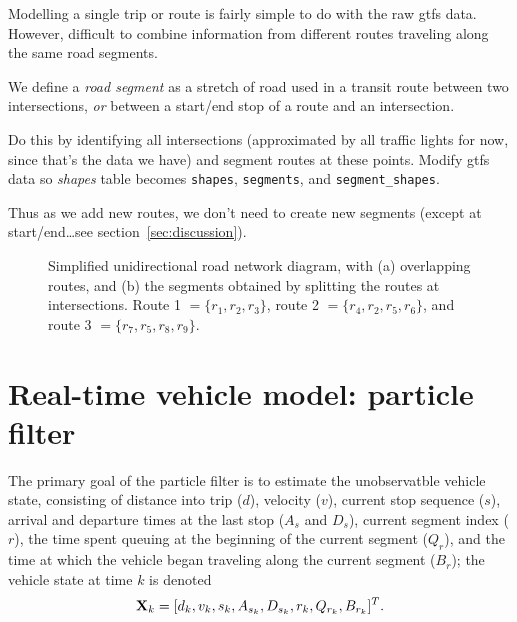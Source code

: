 \documentclass[draftcls,a4paper,onecolumn]{IEEEtran}\usepackage[]{graphicx}\usepackage[]{color}
\newenvironment{knitrout}{}{} %
\begin{document}
Modelling a single trip or route is fairly simple to do with the raw \gls{gtfs} data.
However, difficult to combine information from different routes traveling along the same road segments.

We define a \emph{road segment} as a stretch of road used in a transit route between two intersections,
\emph{or} between a start/end stop of a route and an intersection.

Do this by identifying all intersections
(approximated by all traffic lights for now, since that's the data we have)
and segment routes at these points.
Modify \gls{gtfs} data so \emph{shapes} table becomes
\texttt{shapes}, \texttt{segments}, and \texttt{segment\_shapes}.

Thus as we add new routes, we don't need to create new segments
(except at start/end\ldots see section~\ref{sec:discussion}).


\begin{knitrout}
\color{fgcolor}\begin{figure}
\caption[Simplied diagram of overlapping routes]{Simplified unidirectional road network diagram, with (a) overlapping routes, and (b) the segments obtained by splitting the routes at intersections. Route 1 $ = \{r_1, r_2, r_3\}$, route 2 $=\{r_4,r_2,r_5,r_6\}$, and route 3 $=\{r_7,r_5,r_8,r_9\}$.}\label{fig:route_segmentation}
\end{figure}


\end{knitrout}



\section{Real-time vehicle model: particle filter}
\label{sec:pf}

The primary goal of the particle filter is to estimate the unobservatble
vehicle state,
consisting of distance into trip ($d$), velocity ($v$),
current stop sequence ($s$), 
arrival and departure times at the last stop ($A_s$ and $D_s$),
current segment index ($r$),
the time spent queuing at the beginning of the current segment ($Q_r$),
and the time at which the vehicle began traveling along the current segment ($B_r$);
the vehicle state at time $k$ is denoted
\begin{equation}
  \label{eq:vehiclestate}
  \mathbf{X}_k = [d_k, v_k, s_k, A_{s_k}, D_{s_k}, r_k, Q_{r_k}, B_{r_k}]^T.
\end{equation}
\end{document}
